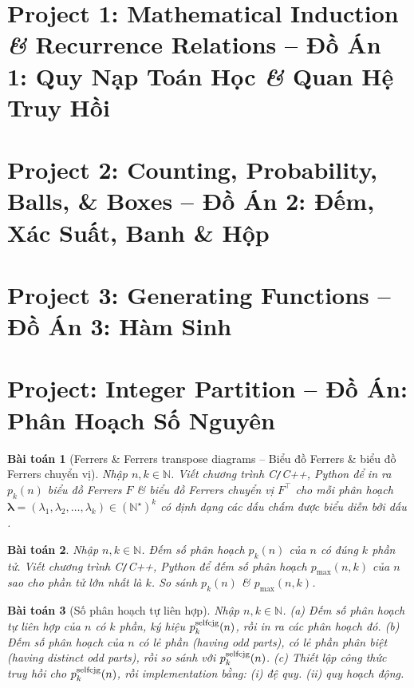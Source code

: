 \documentclass{article}
\newtheorem{baitoan}{Bài toán}
\begin{document}

\section{Project 1: Mathematical Induction {\it\&} Recurrence Relations -- Đồ Án 1: Quy Nạp Toán Học {\it\&} Quan Hệ Truy Hồi}


\section{Project 2: Counting, Probability, Balls, \& Boxes -- Đồ Án 2: Đếm, Xác Suất, Banh \& Hộp}


\section{Project 3: Generating Functions -- Đồ Án 3: Hàm Sinh}

\section{Project: Integer Partition -- Đồ Án: Phân Hoạch Số Nguyên}

\begin{baitoan}[Ferrers \& Ferrers transpose diagrams -- Biểu đồ Ferrers \& biểu đồ Ferrers chuyển vị]
    Nhập $n,k\in\mathbb{N}$. Viết chương trình {\sf C{\tt/}C++, Python} để in ra $p_k(n)$ biểu đồ Ferrers $F$ \& biểu đồ Ferrers chuyển vị $F^\top$ cho mỗi phân hoạch $\boldsymbol{\lambda} = (\lambda_1,\lambda_2,\ldots,\lambda_k)\in(\mathbb{N}^\star)^k$ có định dạng các dấu chấm được biểu diễn bởi dấu {\tt*}.
\end{baitoan}

\begin{baitoan}
    Nhập $n,k\in\mathbb{N}$. Đếm số phân hoạch $p_k(n)$ của $n$ có đúng $k$ phần tử. Viết chương trình {\sf C{\tt/}C++, Python} để đếm số phân hoạch $p_{\max}(n,k)$ của $n$ sao cho phần tử lớn nhất là $k$. So sánh $p_k(n)$ \& $p_{\max}(n,k)$.
\end{baitoan}

\begin{baitoan}[Số phân hoạch tự liên hợp]
    Nhập $n,k\in\mathbb{N}$. (a) Đếm số phân hoạch tự liên hợp của $n$ có $k$ phần, ký hiệu $p_k^{\rm selfcjg}(n)$, rồi in ra các phân hoạch đó. (b) Đếm số phân hoạch của $n$ có lẻ phần (having odd parts), có lẻ phần phân biệt (having distinct odd parts), rồi so sánh với $p_k^{\rm selfcjg}(n)$. (c) Thiết lập công thức truy hồi cho $p_k^{\rm selfcjg}(n)$, rồi implementation bằng: (i) đệ quy. (ii) quy hoạch động.
\end{baitoan}
\end{document}
